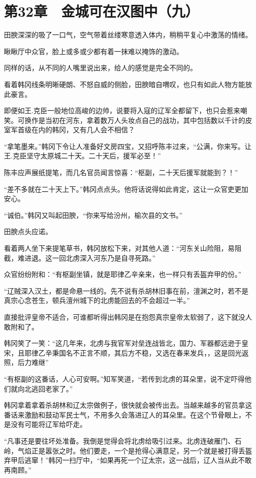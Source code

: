 \section{第32章　金城可在汉图中（九）}

田腴深深的吸了一口气，空气带着丝缕寒意透入体内，稍稍平复心中激荡的情绪。

瞅瞅厅中众官，脸上或多或少都有着一抹难以掩饰的激动。

同样的话，从不同的人嘴里说出来，给人的感觉是完全不同的。

看着韩冈线条明晰硬朗、不怒自威的侧脸，田腴暗自喟叹，也只有如此人物方能放此豪言。

即便如王.克臣一般地位高峻的边帅，说要将入寇的辽军全都留下，也只会惹来嘲笑。可换作是当初在河东，拿着数万人头妆点自己的战功，其中包括数以千计的皮室军首级在内的韩冈，又有几人会不相信？

“拿笔墨来。”韩冈下令让人准备好文房四宝，又招呼陈丰过来，“公满，你来写。让王.克臣坚守太原城二十天。二十天后，援军必至！”

陈丰应声展纸提笔，而几名官员闻言惊喜：“枢副，二十天后援军就能到？！”

“差不多就在二十天上下。”韩冈点点头。他将话说得如此肯定，这让一众官吏更加安心。

“诚伯。”韩冈又叫起田腴，“你来写给汾州，榆次县的文书。”

田腴点头应诺。

看着两人坐下来提笔草书，韩冈放松下来，对其他人道：“河东关山险阻，易阻截，难进退。这一回北虏深入河东乃是自寻死路。”

众官纷纷附和：“有枢副坐镇，就是耶律乙辛亲来，也一样只有丢盔弃甲的份。”

“辽贼深入汉土，都是命悬一线的。先不说有杀胡林旧事在前，澶渊之时，若不是真宗心念苍生，顿兵澶州城下的北虏能回去的不会超过一半。”

直接批评皇帝不适合，可谁都听得出韩冈是在抱怨真宗皇帝太软弱了，这下就没人敢附和了。

韩冈笑了一笑：“这几年来，北虏与我官军对垒连战皆北，国力、军器都远逊于皇宋，且耶律乙辛秉国名不正言不顺，其后方不稳，又选在春来发兵，，这是回光返照，后力难继”

“有枢副的这番话，人心可安啊。”知军笑道，“若传到北虏的耳朵里，说不定吓得他们就向北逃回老家了。”

韩冈拿着拿着杀胡林和辽太宗做例子，很快就会被传出去。当越来越多的官员拿这番话来激励和鼓动军民士气，不用多久会落进辽人的耳朵里。在这个节骨眼上，不是没有可能将辽军给吓走。

“凡事还是要往坏处准备。我倒是觉得会将北虏给吸引过来。北虏连破雁门、石岭，气焰正是嚣张之时。他们要走，一个是抢得心满意足，另一个就是被打得丢盔弃甲后逃窜！”韩冈一扫厅中，“如果再死一个辽太宗，这一战后，辽人当从此不敢再南顾。”

